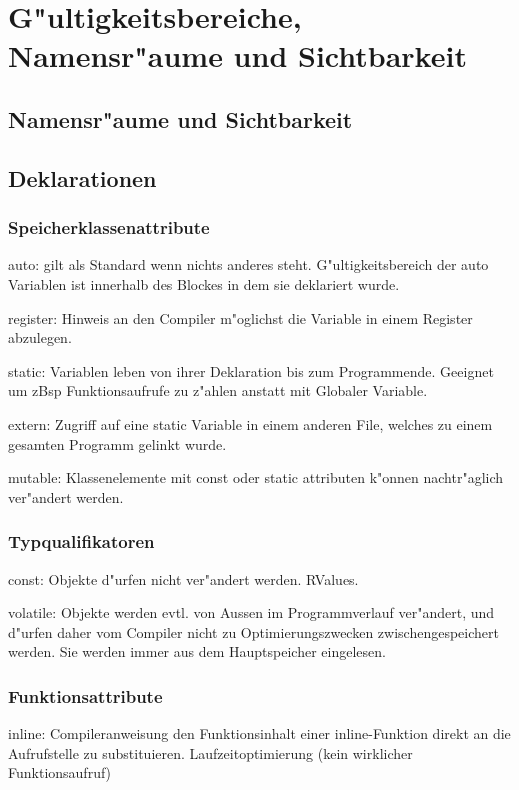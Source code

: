 \section{G"ultigkeitsbereiche, Namensr"aume und Sichtbarkeit}
	\subsection{Namensr"aume und Sichtbarkeit}
	\subsection{Deklarationen}
		\subsubsection{Speicherklassenattribute}
	\begin{compactitem}
		\item auto: gilt als Standard wenn nichts anderes steht. G"ultigkeitsbereich der auto Variablen ist innerhalb des Blockes in dem sie deklariert wurde.
		\item register: Hinweis an den Compiler m"oglichst die Variable in einem Register abzulegen.
		\item static: Variablen leben von ihrer Deklaration bis zum Programmende. Geeignet um zBsp Funktionsaufrufe zu z"ahlen anstatt mit Globaler Variable.
		\item extern: Zugriff auf eine static Variable in einem anderen File, welches zu einem gesamten Programm gelinkt wurde.
		\item mutable: Klassenelemente mit const oder static attributen k"onnen nachtr"aglich ver"andert werden.
	\end{compactitem}
		\subsubsection{Typqualifikatoren}
		\begin{compactitem}
			\item const: Objekte d"urfen nicht ver"andert werden. RValues.
			\item volatile: Objekte werden evtl. von Aussen im Programmverlauf ver"andert, und d"urfen daher vom Compiler nicht zu Optimierungszwecken zwischengespeichert werden. Sie werden immer aus dem Hauptspeicher eingelesen.
		\end{compactitem}
		\subsubsection{Funktionsattribute}
		\begin{compactitem}
			\item inline: Compileranweisung den Funktionsinhalt einer inline-Funktion direkt an die Aufrufstelle zu substituieren. Laufzeitoptimierung (kein wirklicher Funktionsaufruf)
		\end{compactitem}
